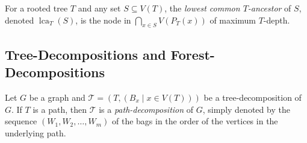\documentclass{patmorin}
\newcommand{\defin}[1]{\emph{\textcolor{brightmaroon}{#1}}}
\DeclareMathOperator{\lca}{lca}
\newcommand{\calT}{\mathcal{T}}
\begin{document}
  For a rooted tree $T$ and any set $S\subseteq V(T)$, the \defin{lowest common $T$-ancestor} of $S$, denoted \defin{$\lca_T(S)$}, is the node in $\bigcap_{x\in S} V(P_T(x))$ of maximum $T$-depth.



  \subsection{Tree-Decompositions and Forest-Decompositions}




  Let $G$ be a graph and $\calT=(T,(B_x \mid x\in V(T)))$ be a tree-decomposition of $G$. If $T$ is a path, then $\calT$ is a \defin{path-decomposition} of $G$, simply denoted by the sequence $(W_1, W_2, \dots, W_m)$ of the bags in the order of the vertices in the underlying path.
\end{document}
